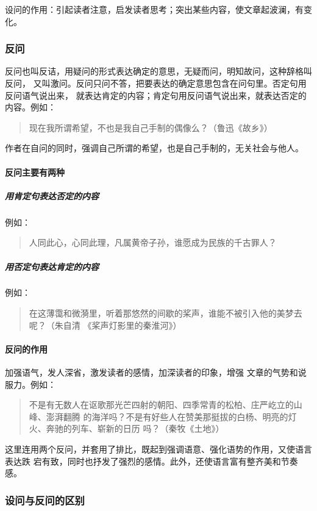 \documentclass[final,oneside]{ctexbook}
\newenvironment{equotation}{\begin{quotation}\kaishu}{\end{quotation}}
\begin{document}
设问的作用：引起读者注意，启发读者思考；突出某些内容，使文章起波澜，有变化。

\subsubsection{反问}

 
反问也叫反诘，用疑问的形式表达确定的意思，无疑而问，明知故问，这种辞格叫反问，
又叫激问。反问只问不答，把要表达的确定意思包含在问句里。否定句用反问语气说出来，
就表达肯定的内容；肯定句用反问语气说出来，就表达否定的内容。例如：
\begin{equotation}
  现在我所谓希望，不也是我自己手制的偶像么？（鲁迅《故乡》）
\end{equotation}
作者在自问的同时，强调自己所谓的希望，也是自己手制的，无关社会与他人。

\paragraph{反问主要有两种}

\subparagraph{用肯定句表达否定的内容}例如：
\begin{equotation}
  人同此心，心同此理，凡属黄帝子孙，谁愿成为民族的千古罪人？
\end{equotation}

\subparagraph{用否定句表达肯定的内容}例如：
\begin{equotation}
  在这薄霭和微漪里，听着那悠然的间歇的桨声，谁能不被引入他的美梦去呢？（朱自清
  《桨声灯影里的秦淮河》）
\end{equotation}

\paragraph{反问的作用}加强语气，发人深省，激发读者的感情，加深读者的印象，增强
文章的气势和说服力。例如：
\begin{equotation}
  不是有无数人在讴歌那光芒四射的朝阳、四季常青的松柏、庄严屹立的山峰、澎湃翻腾
  的海洋吗？不是有好些人在赞美那挺拔的白杨、明亮的灯火、奔驰的列车、崭新的日历
  吗？（秦牧《土地》）
\end{equotation}
这里连用两个反问，并套用了排比，既起到强调语意、强化语势的作用，又使语言表达跌
宕有致，同时也抒发了强烈的感情。此外，还使语言富有整齐美和节奏感。

\subsubsection{设问与反问的区别}
\end{document}
